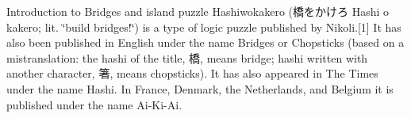 Introduction to Bridges and island puzzle Hashiwokakero (橋をかけろ Hashi o kakero; lit. \char`\"{}build bridges!\char`\"{}) is a type of logic puzzle published by Nikoli.\mbox{[}1\mbox{]} It has also been published in English under the name Bridges or Chopsticks (based on a mistranslation\+: the hashi of the title, 橋, means bridge; hashi written with another character, 箸, means chopsticks). It has also appeared in The Times under the name Hashi. In France, Denmark, the Netherlands, and Belgium it is published under the name Ai-\/\+Ki-\/\+Ai. 